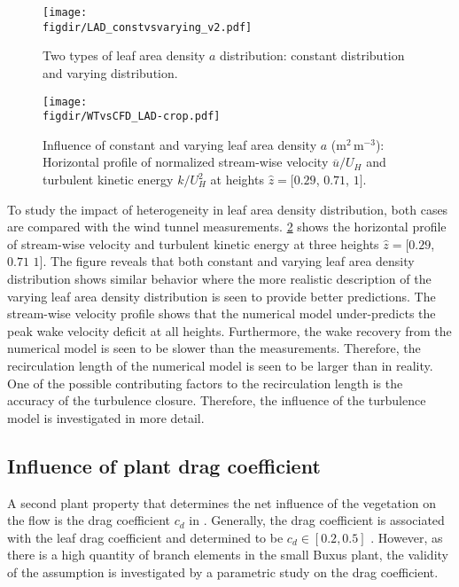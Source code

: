 	
\begin{figure}[t]
	\centering
	\texttt{[image: \\figdir/LAD\_constvsvarying\_v2.pdf]}
	\caption{Two types of leaf area density $a$ distribution:   constant distribution and  varying distribution.}
	\label{fig:LAD_constvsvarying}
\end{figure}

\begin{figure}[p]
	\centering
	\texttt{[image: \\figdir/WTvsCFD\_LAD-crop.pdf]}
	\caption{Influence of constant and varying leaf area density $a$ (m$^2$\,m$^{-3}$): Horizontal profile of normalized stream-wise velocity $\overline{u}/U_H$ and turbulent kinetic energy $k/U_H^2$ at heights $\hat{z} = [0.29$, $0.71$, $1]$.}
	\label{fig:WTvsCFD_LAD}
\end{figure}

To study the impact of heterogeneity in leaf area density distribution, both cases are compared with the wind tunnel measurements. \cref{fig:WTvsCFD_LAD} shows the horizontal profile of  stream-wise velocity and turbulent kinetic energy at three heights $\hat{z} = [0.29$, $0.71$ $1]$.  The figure reveals that both constant and varying leaf area density distribution shows similar behavior where the more realistic description of the varying leaf area density distribution is seen to provide better predictions. The stream-wise velocity profile shows that the numerical model under-predicts the peak wake velocity deficit at all heights. Furthermore, the wake recovery from the numerical model is seen to be slower than the measurements. Therefore, the recirculation length of the numerical model is seen to be larger than in reality. One of the possible contributing factors to the recirculation length is the accuracy of the turbulence closure. Therefore, the influence of the turbulence model is investigated in more detail. 

\subsection{Influence of plant drag coefficient}

A second plant property that determines the net influence of the vegetation on the flow is the drag coefficient $c_d$ in . Generally, the drag coefficient is associated with the leaf drag coefficient and determined to be  $c_d \in [0.2, 0.5]$ \citep{Vogel1989,Wilson1977}. However, as there is a high quantity of branch elements in the small Buxus plant, the validity of the assumption is investigated by a parametric study on the drag coefficient.

